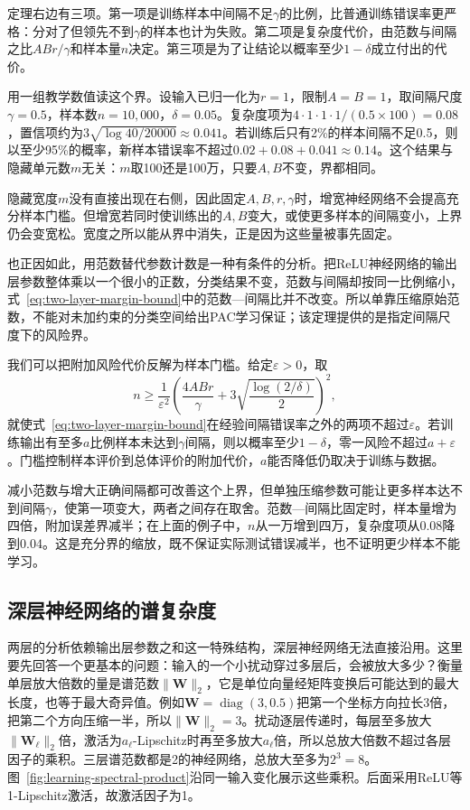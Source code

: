 定理右边有三项。第一项是训练样本中间隔不足$\gamma$的比例，比普通训练错误率更严格：分对了但领先不到$\gamma$的样本也计为失败。第二项是复杂度代价，由范数与间隔之比$AB r/\gamma$和样本量$n$决定。第三项是为了让结论以概率至少$1-\delta$成立付出的代价。

用一组教学数值读这个界。设输入已归一化为$r=1$，限制$A=B=1$，取间隔尺度$\gamma=0.5$，样本数$n=10{,}000$，$\delta=0.05$。复杂度项为$4\cdot1\cdot1\cdot1/(0.5\times100)=0.08$，置信项约为$3\sqrt{\log 40/20000}\approx0.041$。若训练后只有2\%的样本间隔不足0.5，则以至少95\%的概率，新样本错误率不超过$0.02+0.08+0.041\approx0.14$。这个结果与隐藏单元数$m$无关：$m$取100还是100万，只要$A,B$不变，界都相同。

隐藏宽度$m$没有直接出现在右侧，因此固定$A,B,r,\gamma$时，增宽神经网络不会提高充分样本门槛。但增宽若同时使训练出的$A,B$变大，或使更多样本的间隔变小，上界仍会变宽松。宽度之所以能从界中消失，正是因为这些量被事先固定。

也正因如此，用范数替代参数计数是一种有条件的分析。把ReLU神经网络的输出层参数整体乘以一个很小的正数，分类结果不变，范数与间隔却按同一比例缩小，式~\eqref{eq:two-layer-margin-bound}中的范数—间隔比并不改变。所以单靠压缩原始范数，不能对未加约束的分类空间给出PAC学习保证；该定理提供的是指定间隔尺度下的风险界。

我们可以把附加风险代价反解为样本门槛。给定$\varepsilon>0$，取
\begin{equation}
 n\geq\frac1{\varepsilon^2}
 \left(\frac{4ABr}{\gamma}
       +3\sqrt{\frac{\log(2/\delta)}2}\right)^2,
 \label{eq:two-layer-sample-requirement}
\end{equation}
就使式~\eqref{eq:two-layer-margin-bound}在经验间隔错误率之外的两项不超过$\varepsilon$。若训练输出有至多$a$比例样本未达到$\gamma$间隔，则以概率至少$1-\delta$，零一风险不超过$a+\varepsilon$。门槛控制样本评价到总体评价的附加代价，$a$能否降低仍取决于训练与数据。

减小范数与增大正确间隔都可改善这个上界，但单独压缩参数可能让更多样本达不到间隔$\gamma$，使第一项变大，两者之间存在取舍。范数—间隔比固定时，样本量增为四倍，附加误差界减半；在上面的例子中，$n$从一万增到四万，复杂度项从0.08降到0.04。这是充分界的缩放，既不保证实际测试错误减半，也不证明更少样本不能学习。

\subsection{深层神经网络的谱复杂度}

两层的分析依赖输出层参数之和这一特殊结构，深层神经网络无法直接沿用。这里要先回答一个更基本的问题：输入的一个小扰动穿过多层后，会被放大多少？衡量单层放大倍数的量是谱范数$\|\bm W\|_2$，它是单位向量经矩阵变换后可能达到的最大长度，也等于最大奇异值。例如$\bm W=\operatorname{diag}(3,0.5)$把第一个坐标方向拉长3倍，把第二个方向压缩一半，所以$\|\bm W\|_2=3$。扰动逐层传递时，每层至多放大$\|\bm W_\ell\|_2$倍，激活为$a_\ell$-Lipschitz时再至多放大$a_\ell$倍，所以总放大倍数不超过各层因子的乘积。三层谱范数都是2的神经网络，总放大至多为$2^3=8$。图~\ref{fig:learning-spectral-product}沿同一输入变化展示这些乘积。后面采用ReLU等1-Lipschitz激活，故激活因子为1。

